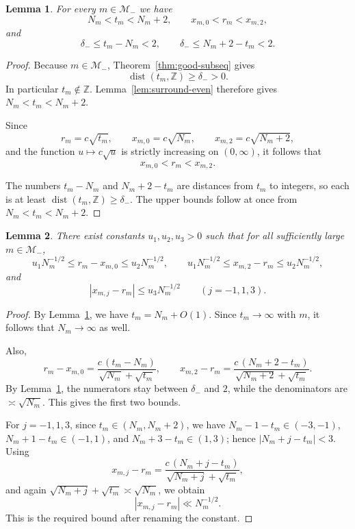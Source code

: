 \documentclass[reqno]{amsart}
\theoremstyle{definition}
\theoremstyle{plain}
\newtheorem{lemma}      {Lemma}
\theoremstyle{remark}
\numberwithin{equation}{section}
\newcommand{\Z}{\mathbb{Z}}
\newcommand{\dist}{\operatorname{dist}}
\begin{document}
\begin{lemma}\label{lem:minus-placement}
For every $m\in\mathcal M_-$ we have
\[
  N_m<t_m<N_m+2,
  \qquad
  x_{m,0}<r_m<x_{m,2},
\]
and
\[
  \delta_-\le t_m-N_m<2,
  \qquad
  \delta_-\le N_m+2-t_m<2.
\]
\end{lemma}

\begin{proof}
Because $m\in\mathcal M_-$, Theorem~\ref{thm:good-subseq} gives
\[
  \dist(t_m,\Z)\ge \delta_->0.
\]
In particular $t_m\notin\Z$. Lemma~\ref{lem:surround-even} therefore gives $N_m<t_m<N_m+2$.

Since
\[
  r_m=c\sqrt{t_m},
  \qquad
  x_{m,0}=c\sqrt{N_m},
  \qquad
  x_{m,2}=c\sqrt{N_m+2},
\]
and the function $u\mapsto c\sqrt{u}$ is strictly increasing on $(0,\infty)$, it follows that
\[
  x_{m,0}<r_m<x_{m,2}.
\]

The numbers $t_m-N_m$ and $N_m+2-t_m$ are distances from $t_m$ to integers, so each is at least $\dist(t_m,\Z)\ge \delta_-$. The upper bounds follow at once from $N_m<t_m<N_m+2$.
\end{proof}

\begin{lemma}\label{lem:minus-distances}
There exist constants $u_1,u_2,u_3>0$ such that for all sufficiently large $m\in\mathcal M_-$,
\[
  u_1N_m^{-1/2}\le r_m-x_{m,0}\le u_2N_m^{-1/2},
  \qquad
  u_1N_m^{-1/2}\le x_{m,2}-r_m\le u_2N_m^{-1/2},
\]
and
\[
  |x_{m,j}-r_m|\le u_3N_m^{-1/2}
  \qquad (j=-1,1,3).
\]
\end{lemma}

\begin{proof}
By Lemma~\ref{lem:minus-placement}, we have $t_m=N_m+O(1)$. Since $t_m\to\infty$ with $m$, it follows that $N_m\to\infty$ as well.

Also,
\[
  r_m-x_{m,0}
  =\frac{c\,(t_m-N_m)}{\sqrt{N_m}+\sqrt{t_m}},
  \qquad
  x_{m,2}-r_m
  =\frac{c\,(N_m+2-t_m)}{\sqrt{N_m+2}+\sqrt{t_m}}.
\]
By Lemma~\ref{lem:minus-placement}, the numerators stay between $\delta_-$ and $2$, while the denominators are $\asymp \sqrt{N_m}$. This gives the first two bounds.

For $j=-1,1,3$, since $t_m\in(N_m,N_m+2)$, we have
$N_m-1-t_m\in(-3,-1)$, $N_m+1-t_m\in(-1,1)$, and $N_m+3-t_m\in(1,3)$;
hence $|N_m+j-t_m|<3$. Using
\[
  x_{m,j}-r_m
  =\frac{c\,(N_m+j-t_m)}{\sqrt{N_m+j}+\sqrt{t_m}},
\]
and again $\sqrt{N_m+j}+\sqrt{t_m}\asymp \sqrt{N_m}$, we obtain
\[
  |x_{m,j}-r_m|\ll N_m^{-1/2}.
\]
This is the required bound after renaming the constant.
\end{proof}
\end{document}
